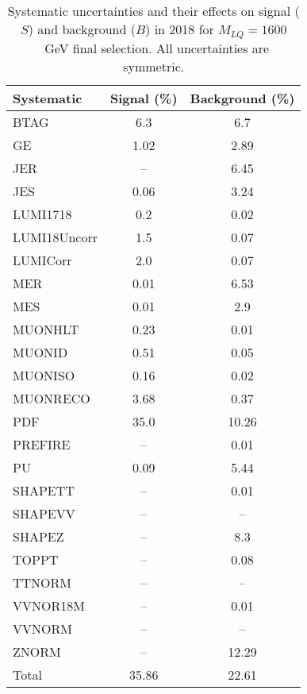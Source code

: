 \begin{table}[htbp]
\begin{center}
\caption{Systematic uncertainties and their effects on signal ($S$) and background ($B$) in 2018 for $M_{LQ}=1600$~GeV final selection. All uncertainties are symmetric.}
\begin{tabular}{lcc}
\hline\hline
Systematic & Signal (\%) & Background (\%) \\ \hline 
BTAG & 6.3 & 6.7\\ 
GE & 1.02 & 2.89\\ 
JER & -- & 6.45\\ 
JES & 0.06 & 3.24\\ 
LUMI1718 & 0.2 & 0.02\\ 
LUMI18Uncorr & 1.5 & 0.07\\ 
LUMICorr & 2.0 & 0.07\\ 
MER & 0.01 & 6.53\\ 
MES & 0.01 & 2.9\\ 
MUONHLT & 0.23 & 0.01\\ 
MUONID & 0.51 & 0.05\\ 
MUONISO & 0.16 & 0.02\\ 
MUONRECO & 3.68 & 0.37\\ 
PDF & 35.0 & 10.26\\ 
PREFIRE & -- & 0.01\\ 
PU & 0.09 & 5.44\\ 
SHAPETT & -- & 0.01\\ 
SHAPEVV & -- & --\\ 
SHAPEZ & -- & 8.3\\ 
TOPPT & -- & 0.08\\ 
TTNORM & -- & --\\ 
VVNOR18M & -- & 0.01\\ 
VVNORM & -- & --\\ 
ZNORM & -- & 12.29\\ 
Total & 35.86 & 22.61\\ \hline \hline
\end{tabular}
\label{tab:SysUncertainties_uujj_1600}
\end{center}
\end{table}

